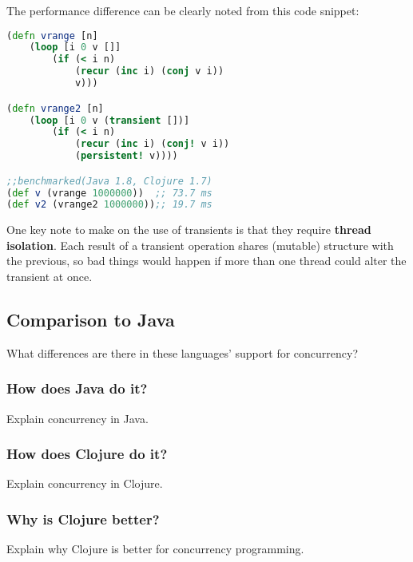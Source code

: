     The performance difference can be clearly noted from this code snippet:
	\begin{lstlisting}[language=clojure]
(defn vrange [n]
	(loop [i 0 v []]
		(if (< i n)
			(recur (inc i) (conj v i))
			v)))

(defn vrange2 [n]
	(loop [i 0 v (transient [])]
		(if (< i n)
			(recur (inc i) (conj! v i))
			(persistent! v))))

;;benchmarked(Java 1.8, Clojure 1.7)
(def v (vrange 1000000))  ;; 73.7 ms
(def v2 (vrange2 1000000));; 19.7 ms
	\end{lstlisting}

    One key note to make on the use of transients is that they require \textbf{thread isolation}. Each result of a transient operation shares (mutable) structure with the previous, so bad things would happen if more than one thread could alter the transient at once. \cite{website:clojure-lang-reference}

\subsection{Comparison to Java}

    What differences are there in these languages' support for concurrency?

\subsubsection{How does Java do it?}

    Explain concurrency in Java.

\subsubsection{How does Clojure do it?}

    Explain concurrency in Clojure.

\subsubsection{Why is Clojure better?}

    Explain why Clojure is better for concurrency programming.
